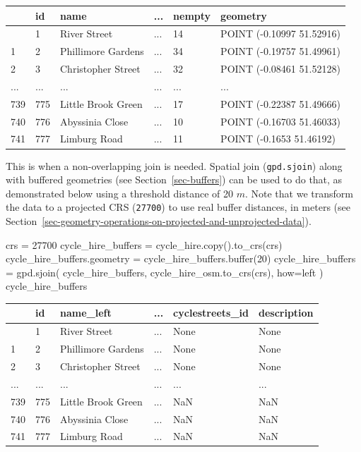 \documentclass[
  letterpaper,
]{krantz}
\newenvironment{Shaded}{\begin{snugshade}}{\end{snugshade}}
\newcommand{\BuiltInTok}[1]{\textcolor[rgb]{0.00,0.23,0.31}{#1}}
\newcommand{\DecValTok}[1]{\textcolor[rgb]{0.68,0.00,0.00}{#1}}
\newcommand{\NormalTok}[1]{\textcolor[rgb]{0.00,0.23,0.31}{#1}}
\newcommand{\OperatorTok}[1]{\textcolor[rgb]{0.37,0.37,0.37}{#1}}
\newcommand{\StringTok}[1]{\textcolor[rgb]{0.13,0.47,0.30}{#1}}
\begin{document}
\begin{longtable}[]{@{}llllll@{}}
\toprule\noalign{}
& id & name & ... & nempty & geometry \\
\midrule\noalign{}
\endhead
\bottomrule\noalign{}
\endlastfoot
0 & 1 & River Street & ... & 14 & POINT (-0.10997 51.52916) \\
1 & 2 & Phillimore Gardens & ... & 34 & POINT (-0.19757 51.49961) \\
2 & 3 & Christopher Street & ... & 32 & POINT (-0.08461 51.52128) \\
... & ... & ... & ... & ... & ... \\
739 & 775 & Little Brook Green & ... & 17 & POINT (-0.22387 51.49666) \\
740 & 776 & Abyssinia Close & ... & 10 & POINT (-0.16703 51.46033) \\
741 & 777 & Limburg Road & ... & 11 & POINT (-0.1653 51.46192) \\
\end{longtable}

This is when a non-overlapping join is needed. Spatial join
(\texttt{gpd.sjoin}) along with buffered geometries (see
Section~\ref{sec-buffers}) can be used to do that, as demonstrated below
using a threshold distance of 20 \(m\). Note that we transform the data
to a projected CRS (\texttt{27700}) to use real buffer distances, in
meters (see
Section~\ref{sec-geometry-operations-on-projected-and-unprojected-data}).

\begin{Shaded}
\begin{Highlighting}[]
\NormalTok{crs }\OperatorTok{=} \DecValTok{27700}
\NormalTok{cycle\_hire\_buffers }\OperatorTok{=}\NormalTok{ cycle\_hire.copy().to\_crs(crs)}
\NormalTok{cycle\_hire\_buffers.geometry }\OperatorTok{=}\NormalTok{ cycle\_hire\_buffers.}\BuiltInTok{buffer}\NormalTok{(}\DecValTok{20}\NormalTok{)}
\NormalTok{cycle\_hire\_buffers }\OperatorTok{=}\NormalTok{ gpd.sjoin(}
\NormalTok{    cycle\_hire\_buffers, }
\NormalTok{    cycle\_hire\_osm.to\_crs(crs), }
\NormalTok{    how}\OperatorTok{=}\StringTok{\textquotesingle{}left\textquotesingle{}}
\NormalTok{)}
\NormalTok{cycle\_hire\_buffers}
\end{Highlighting}
\end{Shaded}

\begin{longtable}[]{@{}llllll@{}}
\toprule\noalign{}
& id & name\_left & ... & cyclestreets\_id & description \\
\midrule\noalign{}
\endhead
\bottomrule\noalign{}
\endlastfoot
0 & 1 & River Street & ... & None & None \\
1 & 2 & Phillimore Gardens & ... & None & None \\
2 & 3 & Christopher Street & ... & None & None \\
... & ... & ... & ... & ... & ... \\
739 & 775 & Little Brook Green & ... & NaN & NaN \\
740 & 776 & Abyssinia Close & ... & NaN & NaN \\
741 & 777 & Limburg Road & ... & NaN & NaN \\
\end{longtable}
\end{document}
